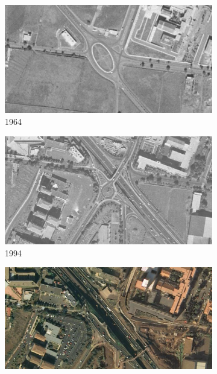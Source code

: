 \begin{figure}[h]
    \centering
    \begin{subfigure}[t]{.49\textwidth}
      \centering
      \includegraphics[width=\textwidth]{report/images/amp-anchieta-1964.png}
      \caption{1964}
      \label{fig:anchieta1964}
    \end{subfigure}
    \hfill
    \begin{subfigure}[t]{.49\textwidth}
      \centering
      \includegraphics[width=\textwidth]{report/images/amp-anchieta-1994.png}
      \caption{1994}
      \label{fig:anchieta1994}
    \end{subfigure}
    \vspace{0.7cm}
    \begin{subfigure}[t]{.49\textwidth}
      \centering
      \includegraphics[width=\textwidth]{report/images/amp-anchieta-2006.png}

\end{subfigure}
\end{figure}
